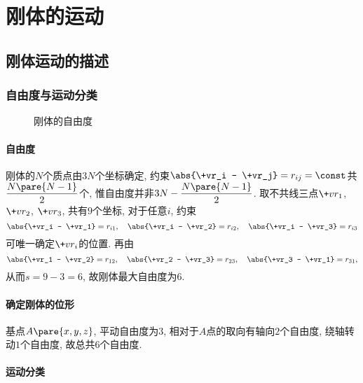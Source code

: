 \documentclass[../LectureNotes.tex]{subfiles}
\begin{document}
\section{刚体的运动} %
\label{sec:刚体的运动}

\subsection{刚体运动的描述} %
\label{sub:刚体运动的描述}

\subsubsection{自由度与运动分类} %
\label{ssub:自由度与运动分类}

\begin{figure}[ht]
    \centering
    \caption{刚体的自由度}
\end{figure}

\paragraph{自由度} %
\label{par:自由度}

刚体的$N$个质点由$3N$个坐标确定, 约束$\abs{\+vr_i - \+vr_j} = r_{ij} = \const$共$\displaystyle \frac{N\pare{N-1}}{2}$个, 惟自由度并非$\displaystyle 3N - \frac{N\pare{N-1}}{2}$. 取不共线三点$\+vr_1$, $\+vr_2$, $\+vr_3$, 共有$9$个坐标, 对于任意$i$, 约束
\[ \abs{\+vr_i - \+vr_1} = r_{i1},\quad \abs{\+vr_i - \+vr_2} = r_{i2},\quad \abs{\+vr_i - \+vr_3} = r_{i3} \]
可唯一确定$\+vr_i$的位置. 再由
\[ \abs{\+vr_1 - \+vr_2} = r_{12},\quad \abs{\+vr_2 - \+vr_3} = r_{23},\quad \abs{\+vr_3 - \+vr_1} = r_{31}, \]
从而$s = 9 - 3 = 6$, 故刚体最大自由度为$6$.


\paragraph{确定刚体的位形} %
\label{par:确定刚体的位形}

基点$A\pare{x,y,z}$, 平动自由度为$3$, 相对于$A$点的取向有轴向$2$个自由度, 绕轴转动$1$个自由度, 故总共$6$个自由度.


\paragraph{运动分类} %
\label{par:运动分类}
\end{document}
